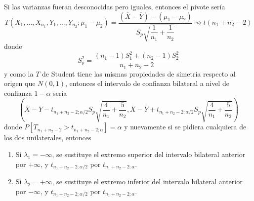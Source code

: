 \documentclass[12pt]{article}
\begin{document}
\begin{ejercicio}
\begin{enumerate}
            Si las varianzas fueran desconocidas pero iguales, entonces el pivote sería
            $$T(X_1, \ldots, X_{n_1}, Y_1, \ldots, Y_{n_2}; \mu_1 - \mu_2) = \dfrac{(\overline{X} - \overline{Y}) - (\mu_1 - \mu_2)}
            {S_p \sqrt{\dfrac{1}{n_1} + \dfrac{1}{n_2}}} \rightsquigarrow t(n_1 + n_2 - 2)$$
            donde $$S_p^2 = \dfrac{(n_1 - 1) S_1^2 + (n_2 - 1)S_2^2}{n_1 + n_2 - 2}$$
            y como la $T$ de Student tiene las mismas propiedades de simetría respecto al origen que $N(0,1)$, entonces
            el intervalo de confianza bilateral a nivel de confianza $1 - \alpha$ sería
            $$\left(\overline{X} - \overline{Y} - t_{n_1+n_2-2;\alpha/2} S_p \sqrt{\dfrac{4}{n_1} + \dfrac{5}{n_2}},
            \overline{X} - \overline{Y} + t_{n_1+n_2-2;\alpha/2} S_p \sqrt{\dfrac{4}{n_1} + \dfrac{5}{n_2}} \right)$$
            donde $P[T_{n_1+n_2-2} > t_{n_1+n_2-2;\alpha}] = \alpha$ y nuevamente si se pidiera cualquiera de los dos unilaterales, entonces
            \begin{enumerate}
                \item Si $\lambda_1 = -\infty$, se sustituye el extremo superior del intervalo bilateral anterior por $+\infty$,
                y $t_{n_1+n_2-2;\alpha/2}$ por $t_{n_1+n_2-2;\alpha}$.
                \item Si $\lambda_2 = +\infty$, se sustituye el extremo inferior del intervalo bilateral anterior por $-\infty$,
                y $t_{n_1+n_2-2;\alpha/2}$ por $t_{n_1+n_2-2;\alpha}$.
            \end{enumerate}
        \end{enumerate}
    \end{ejercicio}

    \newpage
\end{document}
